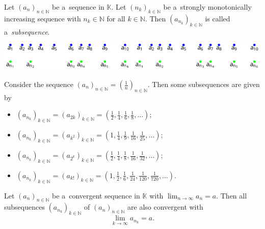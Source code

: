 

\begin{Definition}[Subsequence]
Let $(a_n)_{n\in\mathbb{N}}$ be a~sequence in $\mathbb{K}$. Let $(n_k)_{k\in\mathbb{N}}$ be a~strongly monotonically increasing sequence with $n_k\in\mathbb{N}$ for all $k\in\mathbb{N}$. Then
$(a_{n_k})_{k\in\mathbb{N}}$ is called a~{\em subsequence}.
\end{Definition}

\begin{center}
  \includegraphics{./107-tikz.svg}
\end{center}

\begin{example}
Consider the sequence $(a_n)_{n\in\mathbb{N}}=(\frac1n)_{n\in\mathbb{N}}$. Then some subsequences are given by
\begin{itemize}
 \item $(a_{n_k})_{k\in\mathbb{N}}=(a_{2k})_{k\in\mathbb{N}}=(\frac12,\frac14,\frac16,\frac18,\ldots)$;
 \item $(a_{n_k})_{k\in\mathbb{N}}=(a_{k^2})_{k\in\mathbb{N}}=(1,\frac14,\frac19,\frac1{16},\frac1{25},\ldots)$;
 \item $(a_{n_k})_{k\in\mathbb{N}}=(a_{2^k})_{k\in\mathbb{N}}=(\frac12,\frac14,\frac18,\frac1{16},\frac1{32},\ldots)$;
 \item $(a_{n_k})_{k\in\mathbb{N}}=(a_{k!})_{k\in\mathbb{N}}=(1,\frac12,\frac16,\frac1{24},\frac1{120},\frac1{720},\ldots)$.
\end{itemize}
\end{example}

\begin{Theorem}\label{thm:convsubseq}
Let $(a_n)_{n\in\mathbb{N}}$ be a~convergent sequence in $\mathbb{K}$ with $\lim_{n\to\infty}a_n=a$. Then all subsequences $(a_{n_k})_{k\in\mathbb{N}}$ of $(a_n)_{n\in\mathbb{N}}$ are also convergent with
\[\lim_{k\to\infty}a_{n_k}=a.\]
\end{Theorem}

